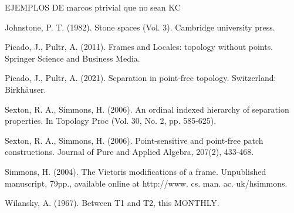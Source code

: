 \documentclass[11pt]{amsart}
\theoremstyle{plain}
\theoremstyle{definition}
\begin{document}
EJEMPLOS DE marcos ptrivial que no sean KC

\begin{thebibliography}{99}
  
  
	 Johnstone, P. T. (1982). Stone spaces (Vol. 3). Cambridge university press.
  
  
  
	
	 Picado, J., Pultr, A. (2011). Frames and Locales: topology without points. Springer Science and Business Media.
	
	 Picado, J., Pultr, A. (2021). Separation in point-free topology. Switzerland: Birkhäuser.
	
	
  
	 Sexton, R. A., Simmons, H. (2006). An ordinal indexed hierarchy of separation properties. In Topology Proc (Vol. 30, No. 2, pp. 585-625).

	 Sexton, R. A., Simmons, H. (2006). Point-sensitive and point-free patch constructions. Journal of Pure and Applied Algebra, 207(2), 433-468.
	  
  
	

	 Simmons, H. (2004). The Vietoris modifications of a frame. Unpublished manuscript, 79pp., available online at http://www. cs. man. ac. uk/hsimmons.

	 Wilansky, A. (1967). Between T1 and T2, this MONTHLY.

\end{thebibliography}
  
%
\end{document}
